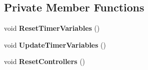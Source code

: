 \subsection*{Private Member Functions}
\begin{DoxyCompactItemize}
\item 
\mbox{\label{class_main_program_a14bb707e4f84a60a734be54aac0cda79}} 
void {\bfseries Reset\+Timer\+Variables} ()
\item 
\mbox{\label{class_main_program_a28c1b51061cfbe7bbe37cd7857408d0b}} 
void {\bfseries Update\+Timer\+Variables} ()
\item 
\mbox{\label{class_main_program_aa696c8af3e8a78a702c6d18f0f7af3ea}} 
void {\bfseries Reset\+Controllers} ()
\end{DoxyCompactItemize}
